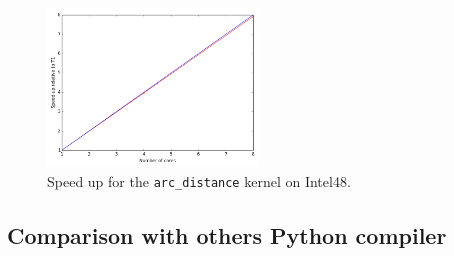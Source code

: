 \documentclass[10pt, preprint]{sigplanconf}
\begin{document}
\begin{figure}[t]
\centering
\includegraphics[width=0.5\textwidth]{arc_distance_intel8.png}
\caption{Speed up for the \texttt{arc\_distance} kernel on Intel48.}
\label{fig:arc_distance_intel8}
\end{figure}

%
%

\subsection{Comparison with others Python compiler}
\end{document}
